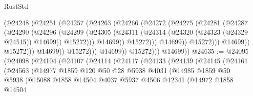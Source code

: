 \begin{lexlean}{RustStd}
\begin{coremodule}
                                    (@24248
                                      (@24251
                                        (@24257
                                          (@24263
                                            (@24266
                                              (@24272
                                                (@24275
                                                  (@24281
                                                    (@24287
                                                      (@24290
                                                        (@24296
                                                          (@24299
                                                            (@24305
                                                              (@24311
                                                                (@24314
                                                                  (@24320
                                                                    (@24323 (@24329 @24515))
                                                                    @14699))
                                                                @15272)))
                                                          @14699))
                                                      @15272)))
                                                @14699))
                                            @15272)))
                                      @14699))
                                  @15272)))
                            @14699))
                        @15272)))
                  @14699))
              @15272)))
        @14699))
@24635 := @24095
    (@24098
      (@24104
        (@24107
          (@24114
            (@24117
              (@24133
                (@24139
                  (@24145
                    (@24161
                      (@24563
                        (@14977
                          @1859
                          @120
                          @50
                          @28
                          @5938
                          @4031
                          (@14985
                            @1859
                            @50
                            @5938
                            (@15088
                              @1858
                              @14504
                              @4037
                              @5937
                              @4506
                              @12341
                              (@14972
                                @1858
                                @14504

\end{coremodule}
\end{lexlean}
